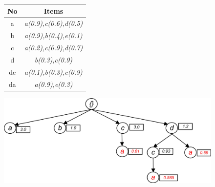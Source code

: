 \begin{figure}
\begin{minipage}{.6\textwidth}
  \centering
  
	\begin{center}
	\begin{tabular}{ |c|c| } 
 	\hline
 		No & Items \\ \hline\hline
 		a  & \emph{a(0.9),c(0.6),d(0.5)}\\ \hline
 		b & \emph{a(0.9),b(0.4),e(0.1)}\\ \hline
 		c & \emph{a(0.2),c(0.9),d(0.7)}\\ \hline
 		d & \emph{b(0.3),c(0.9)}\\ \hline
 		dc& \emph{a(0.1),b(0.3),c(0.9)} \\ \hline
 		da & \emph{a(0.9),e(0.3)
}\\ \hline
\end{tabular}
\end{center}  
  
  
\end{minipage}
\hfill
\begin{minipage}{0.40\textwidth}
  \centering
  \includegraphics[width=.8\textwidth]{../images/frequent_tree_final.jpg}
\end{minipage}

\end{figure}
%
